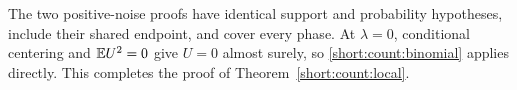 The two positive-noise proofs have identical support and probability
hypotheses, include their shared endpoint, and cover every phase.
At $\lambda=0$, conditional centering and $\mathbb E U^2=0$ give $U=0$
almost surely, so \eqref{short:count:binomial} applies directly.
This completes the proof of Theorem~\ref{short:count:local}.
